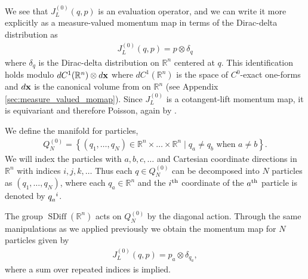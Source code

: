 \documentclass[12pt]{amsart}
\newcommand{\R}{\ensuremath{\mathbb{R}}}
\DeclareMathOperator{\SDiff}{SDiff}
\begin{document}
We see that $J_L^{(0)}(q,p)$ is an evaluation operator, and we can write it 
more explicitly as a measure-valued momentum map in terms of the Dirac-delta distribution as
\begin{align*}
  J_L^{(0)}( q , p ) = p \otimes \delta_q
\end{align*}
where $\delta_q$ is the Dirac-delta distribution on $\R^n$ centered at $q$.
This identification holds modulo $dC^1(\R^n) \otimes d{\bf x}$ where $dC^1(\R^n)$
is the space of $C^0$-exact one-forms and $d{\bf x}$ is the canonical volume from on $\R^n$
(see Appendix \ref{sec:measure_valued_momap}).
Since $J_L^{(0)}$ is a cotangent-lift momentum map, it is equivariant and therefore Poisson, again by \cite[Thm~12.4.9]{MandS}.

We define the manifold for particles,
\begin{align*}
  Q_N^{(0)} = \left\{ (q_1,\dots,q_N) \in \R^n \times \dots\times \R^n
                 \mid q_a \neq q_b \text{ when } a \neq b \right\}.
\end{align*}
We will index the particles with $a,b,c,\dots$ and Cartesian coordinate
directions in $\R^n$ with indices $i,j,k,\dots$
Thus each $q \in Q_N^{(0)}$ can be decomposed
into $N$ particles as $(q_1,\dots,q_N)$, where each $q_a \in \R^n$
and the $i^{\rm th}$ coordinate of the $a^{\rm th}$ particle
is denoted by $q\indices{_a^i}$.

The group $\SDiff(\R^n)$ acts on $Q_N^{(0)}$ by the diagonal action.
Through the same manipulations as we applied previously we obtain the
momentum map for $N$ particles given by
\begin{align*}
  J_L^{(0)}(q,p) = p_a \otimes \delta_{q_a},
\end{align*}
where a sum over repeated indices is implied.
\end{document}
